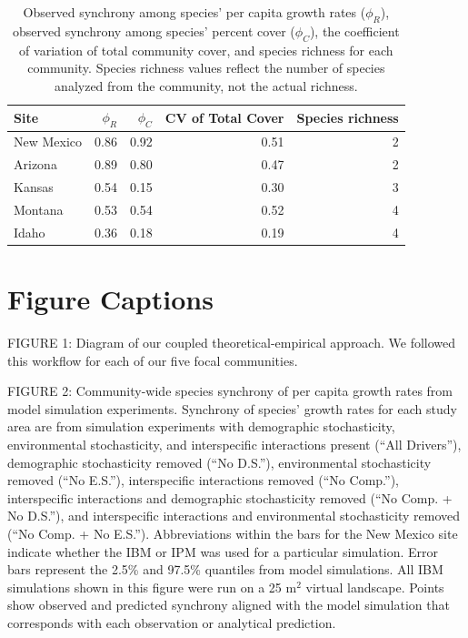 \documentclass[12pt,]{article}
\begin{document}
\normalsize

\pagebreak{}

\begin{table}[ht]
\centering
\caption{Observed synchrony among species' per capita growth rates ($\phi_{R}$), observed synchrony among species' percent cover ($\phi_{C}$), the coefficient of variation of total community cover, and species richness for each community. Species richness values reflect the number of species analyzed from the community, not the actual richness.} 
\begingroup\normalsize
\begin{tabular}{lrrrr}
  \hline
Site & $\phi_{R}$ & $\phi_{C}$ & CV of Total Cover & Species richness \\ 
  \hline
New Mexico & 0.86 & 0.92 & 0.51 &   2 \\ 
  Arizona & 0.89 & 0.80 & 0.47 &   2 \\ 
  Kansas & 0.54 & 0.15 & 0.30 &   3 \\ 
  Montana & 0.53 & 0.54 & 0.52 &   4 \\ 
  Idaho & 0.36 & 0.18 & 0.19 &   4 \\ 
   \hline
\end{tabular}
\endgroup
\end{table}


\pagebreak{}
\section{Figure Captions}
FIGURE 1: Diagram of our coupled theoretical-empirical approach. We followed this workflow for each of our five focal communities.

FIGURE 2: Community-wide species synchrony of per capita growth rates from model simulation experiments. Synchrony of species' growth rates for each study area are from simulation experiments with demographic stochasticity, environmental stochasticity, and interspecific interactions present (``All Drivers''), demographic stochasticity removed (``No D.S.''), environmental stochasticity removed (``No E.S.''), interspecific interactions removed (``No Comp.''), interspecific interactions and demographic stochasticity removed (``No Comp. + No D.S.''), and interspecific interactions and environmental stochasticity removed (``No Comp. + No E.S.''). Abbreviations within the bars for the New Mexico site indicate whether the IBM or IPM was used for a particular simulation. Error bars represent the 2.5\% and 97.5\% quantiles from model simulations. All IBM simulations shown in this figure were run on a 25 $\text{m}^2$ virtual landscape. Points show observed and predicted synchrony aligned with the model simulation that corresponds with each observation or analytical prediction.
\end{document}

